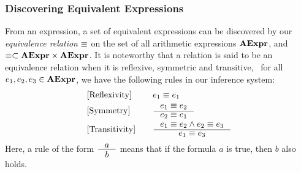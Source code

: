 \subsubsection{Discovering Equivalent Expressions}

From an expression, a set of equivalent expressions can be discovered by our
\emph{equivalence relation} $\equiv$ on the set of all arithmetic expressions
$\mathbf{AExpr}$, and $\equiv \subset \mathbf{AExpr}\times\mathbf{AExpr}$.  It is noteworthy
that a relation is said to be an equivalence relation when it is reflexive,
symmetric and transitive, \ie~for all $e_1, e_2, e_3 \in \mathbf{AExpr}$, we
have the following rules in our inference system:
\begin{equation}
    \begin{aligned}{}
        & [\mathrm{Reflexivity}] & \quad &
            e_1 \eqrel e_1 \\
        & [\mathrm{Symmetry}] & \quad &
            \inference{e_1 \eqrel e_2}{e_2 \eqrel e_1} \\
        & [\mathrm{Transitivity}] & \quad &
            \inference{e_1 \eqrel e_2 \wedge e_2 \eqrel e_3}{e_1 \eqrel e_3}
    \end{aligned}
    \label{so:eq:equivalence_relation}
\end{equation}
Here, a rule of the form $\inference{a}{b}$ means that if the formula $a$ is
true, then $b$ also holds.

